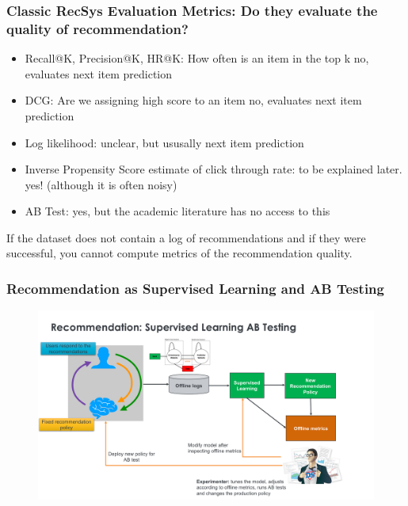 \begin{frame}
  \frametitle{Classic RecSys Evaluation Metrics: Do they evaluate the quality of recommendation?}

  \begin{itemize}
    \item Recall@K, Precision@K, HR@K:  \pause How often is an item in the top k \pause no, evaluates next item prediction \pause
    \item DCG:   \pause Are we assigning high score to an item \pause no, evaluates next item prediction \pause
    \item Log likelihood: \pause  unclear, but ususally next item prediction \pause
    \item Inverse Propensity Score estimate of click through rate: \pause to be explained later. \pause yes! (although it is often noisy) \pause
    \item AB Test: \pause yes, but the academic literature has no access to this 
  \end{itemize}

  \pause
If the dataset does not contain a log of recommendations and if they were successful, you cannot compute metrics of the recommendation quality.
\end{frame}


  
\begin{frame}
  \frametitle{Recommendation as Supervised Learning and AB Testing}
 
 
   \begin{figure}[h!]
     \includegraphics[scale=0.3]{images/recoasabtesting0.png}
       \centering
       \label{motex1}
   \end{figure}
     
 \end{frame}

